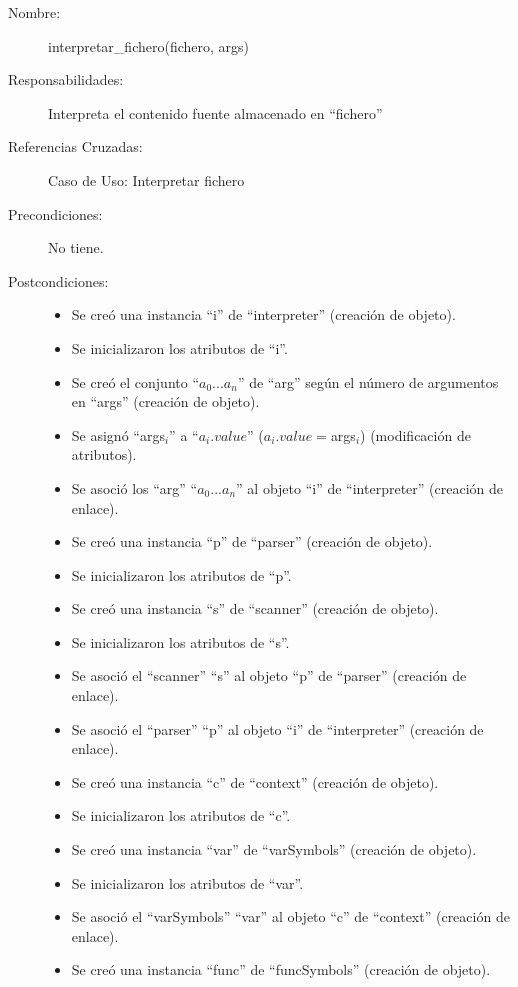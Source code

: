 	\begin{description}
		\item [Nombre:] interpretar\_fichero(fichero, args)
		\item [Responsabilidades:] Interpreta el contenido fuente almacenado en ``fichero''
		\item [Referencias Cruzadas: ] Caso de Uso: Interpretar fichero
      \item [Precondiciones:] No tiene.
      \item [Postcondiciones:] \hfill
      \begin {itemize}
         \item Se creó una instancia ``i'' de ``interpreter'' (creación de objeto).
         \item Se inicializaron los atributos de ``i''.
         \item Se creó el conjunto ``$a_0...a_n$'' de ``arg'' según el número de argumentos en ``args'' (creación de objeto).
         \item Se asignó ``args$_i$'' a ``$a_i.value$'' ($a_i.value = $args$_i$) (modificación de atributos).
         \item Se asoció los ``arg'' ``$a_0...a_n$'' al objeto ``i'' de ``interpreter'' (creación de enlace).
         \item Se creó una instancia ``p'' de ``parser'' (creación de objeto).
         \item Se inicializaron los atributos de ``p''.
         \item Se creó una instancia ``s'' de ``scanner'' (creación de objeto).
         \item Se inicializaron los atributos de ``s''.
         \item Se asoció el ``scanner'' ``s'' al objeto ``p'' de ``parser'' (creación de enlace).
         \item Se asoció el ``parser'' ``p'' al objeto ``i'' de ``interpreter'' (creación de enlace).
         \item Se creó una instancia ``c'' de ``context'' (creación de objeto).
         \item Se inicializaron los atributos de ``c''.
         \item Se creó una instancia ``var'' de ``varSymbols'' (creación de objeto).
         \item Se inicializaron los atributos de ``var''.
         \item Se asoció el ``varSymbols'' ``var'' al objeto ``c'' de ``context'' (creación de enlace).
         \item Se creó una instancia ``func'' de ``funcSymbols'' (creación de objeto).

\end{itemize}
\end{description}
